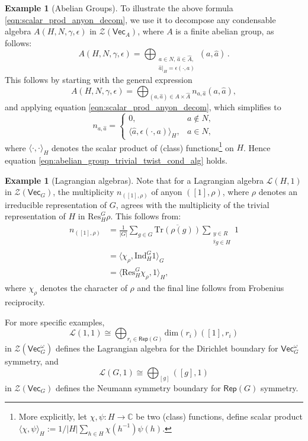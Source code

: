 \documentclass[aps,twocolumn,prx,floatfix,preprintnumbers, nofootinbib,10pt]{revtex4-2}
\numberwithin{equation}{section}
\theoremstyle{definition}
\newtheorem{example}[theorem]{\bf Example}
\newcommand{\be}{\begin{equation}}
\newcommand{\ee}{\end{equation}}
\newcommand{\wh}{\widehat}
\newcommand{\bC}{{\mathbb C}}
\newcommand{\cL}{\mathcal{L}}
\newcommand{\cZ}{\mathcal{Z}}
\newcommand{\Tr}{\text{Tr}}
\renewcommand{\Vec}{\mathsf{Vec}}
\newcommand{\Rep}{\mathsf{Rep}}
\begin{document}
\begin{example}[Abelian Groups]
    To illustrate the above formula \eqref{eqn:scalar_prod_anyon_decom}, we use it to decompose any condensable algebra $A(H,N,\gamma,\epsilon)$ in $\cZ(\Vec_A)$, where $A$ is a finite abelian group, as follows:
    \be
    \label{eqn:abelian_group_trivial_twist_cond_alg}
        A(H,N,\gamma,\epsilon) = \bigoplus_{\substack{a\in N, \, \wh{a}\in \wh{A},\\
        \wh{a}|_H=\epsilon(\cdot, a)}} (a, \wh{a})\,.
    \ee
    This follows by starting with the general expression
    \be
        A(H,N,\gamma,\epsilon) = \bigoplus_{(a,\wh{a})\in A\times \wh{A}} n_{a,\wh{a}}(a,\wh{a}),
    \ee
    and applying equation \eqref{eqn:scalar_prod_anyon_decom}, which simplifies to
    \be
        n_{a,\wh{a}} = \begin{cases}
            0, & a\notin N, \\
            \langle\wh{a}, \epsilon(\cdot, a)\rangle_H, & a\in N,
        \end{cases}
    \ee
    where $\langle\cdot, \cdot\rangle_H$ denotes the scalar product of (class) functions\footnote{More explicitly, let $\chi,\psi:H\rightarrow \bC$ be two (class) functions, define scalar product $\langle\chi, \psi\rangle_{H}:=1/|H|\sum_{h\in H}\chi(h^{-1})\psi(h)$.} on $H$. Hence equation \eqref{eqn:abelian_group_trivial_twist_cond_alg} holds.
\end{example}

\begin{example}[Lagrangian algebras]
    Note that for a Lagrangian algebra $\cL(H, 1)$ in $\cZ(\Vec_G)$, the multiplicity $n_{([1],\rho)}$ of anyon $([1],\rho)$, where $\rho$ denotes an irreducible representation of $G$, agrees with the multiplicity of the trivial representation of $H$ in $\text{Res}^G_H \rho$. This follows from:
    \begin{equation}
        \begin{split}
            n_{([1],\rho)} & = \frac{1}{|G|}\sum_{g\in G} \overline{\Tr(\rho(g))} \sum_{\substack{y\in R\\{}^{\bar{y}}g\in H}}1\\
            & = \langle \chi_\rho, \text{Ind}^G_H 1 \rangle_{G} \\
            & = \langle \text{Res}^G_H\chi_\rho, 1\rangle_H,
        \end{split}
    \end{equation}
    where $\chi_\rho$ denotes the character of $\rho$ and the final line follows from Frobenius reciprocity.

    For more specific examples,
    \be 
     \cL(1,1)\cong\!\!\bigoplus_{r_i \in \Rep (G)} \text{dim} (r_i) ([1], r_i)
    \ee
    in $\cZ(\Vec_G^\omega)$
    defines the Lagrangian algebra for the Dirichlet boundary for $\Vec_G^\omega$ symmetry, and
    \begin{equation}
        \cL(G,1)\cong \bigoplus_{[g]}([g],1)
    \end{equation}
    in $\cZ(\Vec_G)$ defines the Neumann symmetry boundary for $\Rep(G)$ symmetry.
\end{example}
\end{document}
